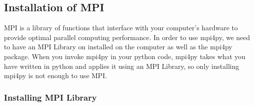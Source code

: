 \subsection*{Installation of MPI}

MPI is a library of functions that interface with your computer's hardware to provide optimal parallel computing performance.
In order to use mpi4py, we need to have an MPI Library on installed on the computer as well as the mpi4py package.
When you invoke mpi4py in your python code, mpi4py takes what you have written in python and applies it using an MPI Library, so only installing mpi4py is not enough to use MPI.


\subsubsection*{Installing MPI Library}
